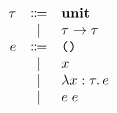\documentclass[12pt]{article}
\begin{document}
\pagestyle{empty}

\begin{align*}
    \begin{array}{rcl}
        \tau
        &\Coloneqq &\mathbf{unit} \\
        &\mid & \tau \to \tau \\
        e
        &\Coloneqq & \text{\texttt{()}} \\
        &\mid & x \\
        &\mid & \lambda x:\tau\ldotp e \\
        &\mid & e\; e
    \end{array}
\end{align*}
\end{document}
